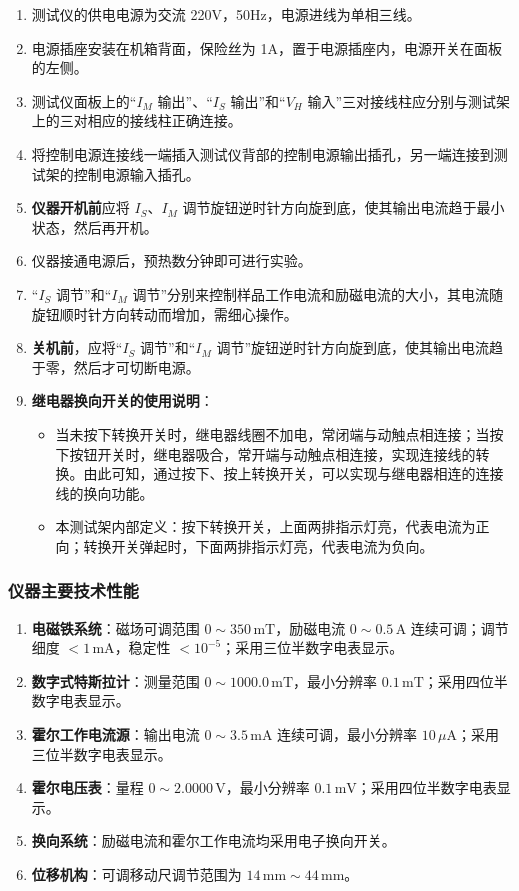 \documentclass[11pt]{article}
\begin{document}
\begin{enumerate}
    \item 测试仪的供电电源为交流 220V，50Hz，电源进线为单相三线。
    \item 电源插座安装在机箱背面，保险丝为 1A，置于电源插座内，电源开关在面板的左侧。
    \item 测试仪面板上的“$I_M$ 输出”、“$I_S$ 输出”和“$V_H$ 输入”三对接线柱应分别与测试架上的三对相应的接线柱正确连接。
    \item 将控制电源连接线一端插入测试仪背部的控制电源输出插孔，另一端连接到测试架的控制电源输入插孔。
    \item \textbf{仪器开机前}应将 $I_S$、$I_M$ 调节旋钮逆时针方向旋到底，使其输出电流趋于最小状态，然后再开机。
    \item 仪器接通电源后，预热数分钟即可进行实验。
    \item “$I_S$ 调节”和“$I_M$ 调节”分别来控制样品工作电流和励磁电流的大小，其电流随旋钮顺时针方向转动而增加，需细心操作。
    \item \textbf{关机前}，应将“$I_S$ 调节”和“$I_M$ 调节”旋钮逆时针方向旋到底，使其输出电流趋于零，然后才可切断电源。
    \item \textbf{继电器换向开关的使用说明}：
    \begin{itemize}
        \item 当未按下转换开关时，继电器线圈不加电，常闭端与动触点相连接；当按下按钮开关时，继电器吸合，常开端与动触点相连接，实现连接线的转换。由此可知，通过按下、按上转换开关，可以实现与继电器相连的连接线的换向功能。
        \item 本测试架内部定义：按下转换开关，上面两排指示灯亮，代表电流为正向；转换开关弹起时，下面两排指示灯亮，代表电流为负向。
    \end{itemize}
\end{enumerate}

\subsubsection{仪器主要技术性能}

\begin{enumerate}
    \item \textbf{电磁铁系统}：磁场可调范围 $0 \sim 350\,\text{mT}$，励磁电流 $0 \sim 0.5\,\text{A}$ 连续可调；调节细度 $< 1\,\text{mA}$，稳定性 $< 10^{-5}$；采用三位半数字电表显示。
    \item \textbf{数字式特斯拉计}：测量范围 $0 \sim 1000.0\,\text{mT}$，最小分辨率 $0.1\,\text{mT}$；采用四位半数字电表显示。
    \item \textbf{霍尔工作电流源}：输出电流 $0 \sim 3.5\,\text{mA}$ 连续可调，最小分辨率 $10\,\mu\text{A}$；采用三位半数字电表显示。
    \item \textbf{霍尔电压表}：量程 $0 \sim 2.0000\,\text{V}$，最小分辨率 $0.1\,\text{mV}$；采用四位半数字电表显示。
    \item \textbf{换向系统}：励磁电流和霍尔工作电流均采用电子换向开关。
    \item \textbf{位移机构}：可调移动尺调节范围为 $14\,\text{mm} \sim 44\,\text{mm}$。
\end{enumerate}
\end{document}
